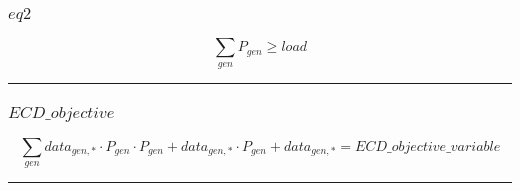 \documentclass[11pt]{article}
\begin{document}
\subsubsection*{$eq2$}
\begin{equation*}
\sum_{gen} P_{gen} \geq load
\end{equation*}
\vspace{5pt}
\hrule
\subsubsection*{$ECD\_objective$}
\begin{equation*}
\sum_{gen} data_{gen,*} \cdot P_{gen} \cdot P_{gen} + data_{gen,*} \cdot P_{gen} + data_{gen,*} = ECD\_objective\_variable
\end{equation*}
\vspace{5pt}
\hrule
\bigskip
\end{document}
